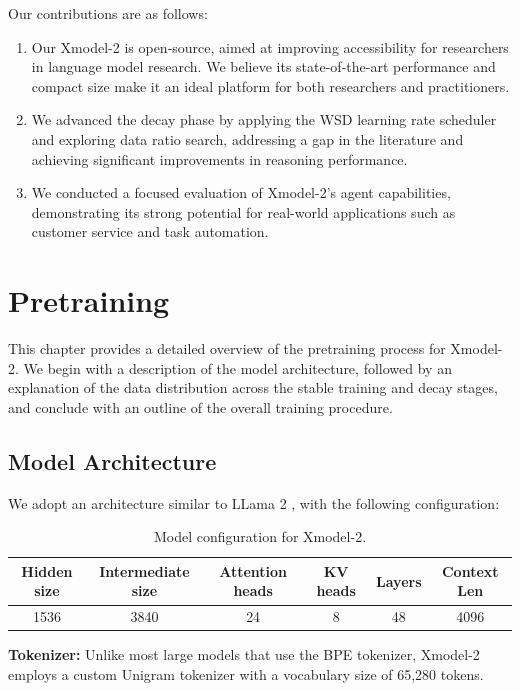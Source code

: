 \documentclass{article}
\newcommand{\llm}{Xmodel-2\xspace}
\begin{document}
Our contributions are as follows:
\begin{enumerate}
    \item Our \llm is open-source, aimed at improving accessibility for researchers in language model research. We believe its state-of-the-art performance and compact size make it an ideal platform for both researchers and practitioners.
    \item We advanced the decay phase by applying the WSD learning rate scheduler and exploring data ratio search, addressing a gap in the literature and achieving significant improvements in reasoning performance.
    \item We conducted a focused evaluation of \llm’s agent capabilities, demonstrating its strong potential for real-world applications such as customer service and task automation. 
\end{enumerate} 


\section{Pretraining}
This chapter provides a detailed overview of the pretraining process for \llm. We begin with a description of the model architecture, followed by an explanation of the data distribution across the stable training and decay stages, and conclude with an outline of the overall training procedure.


\subsection{Model Architecture}

We adopt an architecture similar to LLama 2 \citep{touvron2023llama}, with the following configuration:

\begin{table}[ht]
  \centering
  \setlength{\tabcolsep}{6pt}
  \begin{tabular}{@{}cccccc@{}}
    \toprule
    Hidden size & Intermediate size & Attention heads &  KV heads & Layers & Context Len\\
    \midrule
    1536 & 3840 & 24 & 8 & 48 & 4096\\
    \bottomrule
  \end{tabular}
  \newline
  \caption{Model configuration for \llm.}
  \label{tab: LLM_setting}
\end{table}

\noindent\textbf{Tokenizer:} Unlike most large models that use the BPE tokenizer, \llm employs a custom Unigram tokenizer \citep{kudo2018unigram} with a vocabulary size of 65,280 tokens.
\end{document}
